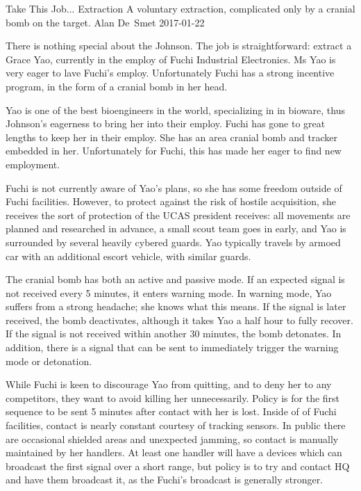 \begin{scenario}[CC-BY-SA-4.0]
	{Take This Job...}
	{Extraction}
	{A voluntary extraction, complicated only by a cranial bomb on the target.}
	{Alan De~Smet}
	{2017-01-22}
	{}

 There is nothing special about the Johnson.  The job is straightforward: extract a Grace Yao, currently in the employ of Fuchi Industrial Electronics.  Ms Yao is very eager to lave Fuchi's employ. Unfortunately Fuchi has a strong incentive program, in the form of a cranial bomb in her head.

\synopsis Yao is one of the best bioengineers in the world, specializing in in bioware, thus Johnson's eagerness to bring her into their employ.  Fuchi has gone to great lengths to keep her in their employ. She has an area cranial bomb and tracker embedded in her.  Unfortunately for Fuchi, this has made her eager to find new employment.

Fuchi is not currently aware of Yao's plans, so she has some freedom outside of Fuchi facilities. However, to protect against the risk of hostile acquisition, she receives the sort of protection of the UCAS president receives: all movements are planned and researched in advance, a small scout team goes in early, and Yao is surrounded by several heavily cybered guards.  Yao typically travels by armoed car with an additional escort vehicle, with similar guards.

The cranial bomb has both an active and passive mode.  If an expected signal is not received every 5 minutes, it enters warning mode.  In warning mode, Yao suffers from a strong headache; she knows what this means.   If the signal is later received, the bomb deactivates, although it takes Yao a half hour to fully recover.  If the signal is not received within another 30 minutes, the bomb detonates.  In addition, there is a signal that can be sent to immediately trigger the warning mode or detonation.

While Fuchi is keen to discourage Yao from quitting, and to deny her to any competitors, they want to avoid killing her unnecessarily.  Policy is for the first sequence to be sent 5 minutes after contact with her is lost.  Inside of of Fuchi facilities, contact is nearly constant courtesy of tracking sensors. In public there are occasional shielded areas and unexpected jamming, so contact is manually maintained by her handlers.  At least one handler will have a devices which can broadcast the first signal over a short range, but policy is to try and contact HQ and have them broadcast it, as the Fuchi's broadcast is generally stronger.


\end{scenario}
